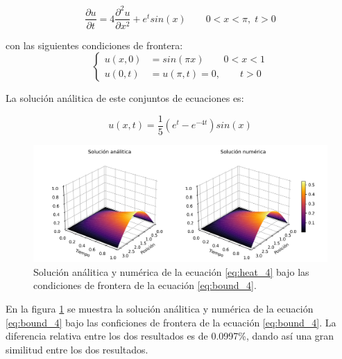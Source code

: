\begin{equation}
	\frac{\partial u}{\partial t} = 4\frac{\partial^2 u}{\partial x^2}+e^tsin(x)\qquad 0<x<\pi, \; t>0 \label{eq:heat_4}
\end{equation}

con las siguientes condiciones de frontera:
\begin{equation}
	\begin{cases}
		u(x,0) & = sin(\pi x) \qquad 0<x<1 \\
		u(0,t) & =u(\pi,t) = 0, \qquad t>0
	\end{cases} \label{eq:bound_4}
\end{equation}

La solución análitica de este conjuntos de ecuaciones es:

\begin{equation}
	u(x,t)=\frac{1}{5}( e^t-e^{-4t})sin(x) \label{eq:sol_4}
\end{equation}


\begin{figure}[H]
	\centering
	\includegraphics[width=17cm]{Graphics/surface_4.png}
	\caption{Solución análitica y numérica de la ecuación \ref{eq:heat_4} bajo las condiciones de frontera de la ecuación \ref{eq:bound_4}.}
	\label{fig:sol_4}
\end{figure}

En la figura \ref{fig:sol_4} se muestra la solución análitica y numérica de la ecuación \ref{eq:bound_4} bajo las conficiones de frontera de la ecuación \ref{eq:bound_4}. La diferencia relativa entre los dos resultados es de 0.0997\%, dando así una gran similitud entre los dos resultados.
